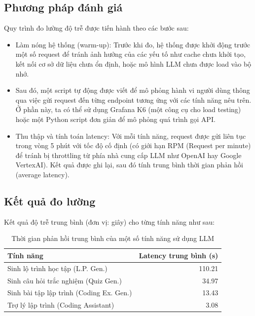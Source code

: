 \subsection{Phương pháp đánh giá}

Quy trình đo lường độ trễ được tiến hành theo các bước sau:

\begin{itemize}
    \item Làm nóng hệ thống (warm-up): Trước khi đo, hệ thống được khởi động trước một số request để tránh ảnh hưởng của các yếu tố như cache chưa khởi tạo, kết nối cơ sở dữ liệu chưa ổn định, hoặc mô hình LLM chưa được load vào bộ nhớ.
    
    \item Sau đó, một script tự động được viết để mô phỏng hành vi người dùng thông qua việc gửi request đến từng endpoint tương ứng với các tính năng nêu trên. Ở phần này, ta có thể sử dụng Grafana K6 (một công cụ cho load testing) hoặc một Python script đơn giản để mô phỏng quá trình gọi API. 

    \item Thu thập và tính toán latency: Với mỗi tính năng, request được gửi liên tục trong vòng 5 phút với tốc độ cố định (có giới hạn RPM (Request per minute) để tránh bị throttling từ phía nhà cung cấp LLM như OpenAI hay Google VertexAI). Kết quả được ghi lại, sau đó tính trung bình thời gian phản hồi (average latency).
\end{itemize}

\subsection{Kết quả đo lường}

Kết quả độ trễ trung bình (đơn vị: giây) cho từng tính năng như sau:

\begin{table}[H]
\centering
\caption{Thời gian phản hồi trung bình của một số tính năng sử dụng LLM}
\label{table:llm_response_time}
\begin{tabular}{l r}
\toprule
\textbf{Tính năng} & \textbf{Latency trung bình (s)} \\
\midrule
Sinh lộ trình học tập (L.P. Gen.) & 110.21 \\
Sinh câu hỏi trắc nghiệm (Quiz Gen.) & 34.97 \\
Sinh bài tập lập trình (Coding Ex. Gen.) & 13.43 \\
Trợ lý lập trình (Coding Assistant) & 3.08 \\
\bottomrule
\end{tabular}

\end{table}

